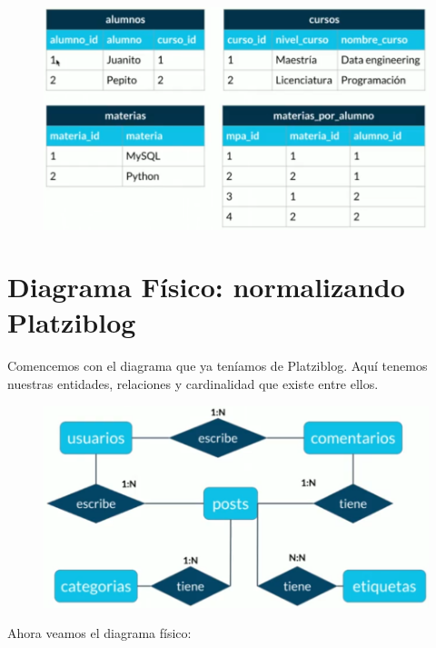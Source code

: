 \documentclass{article}
\begin{document}
\begin{figure}[h!]
    \centering
      \includegraphics[scale=0.45]{./Pictures/026_cuarta_normal.png}
\end{figure}


\section{Diagrama Físico: normalizando Platziblog}%
Comencemos con el diagrama que ya teníamos de Platziblog. Aquí tenemos nuestras
entidades, relaciones y cardinalidad que existe entre ellos.\\

\begin{figure}[h!]
    \centering
      \includegraphics[scale=0.45]{./Pictures/027_diagramaER.png}
\end{figure}

Ahora veamos el diagrama físico:
\end{document}

